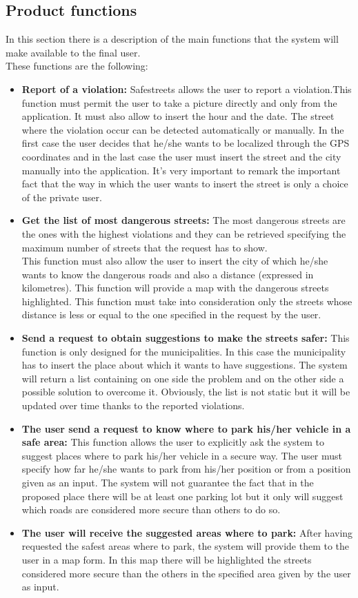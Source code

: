 \documentclass[titlepage]{article}
\begin{document}
\subsection{Product functions}
In this section there is a description of the main functions that the system will make available to the final user.\\
These functions are the following:
\begin{itemize}
	\item \textbf{Report of a violation:} Safestreets allows the user to report a violation.This function must permit the user to take a picture directly and only from the application. It must also allow to insert the hour and the date. The street where the violation occur can be detected automatically or manually. In the first case the user decides that he/she wants to be localized through the GPS coordinates and in the last case the user must insert the street and the city manually into the application. It's very important to remark the important fact that the way in which the user wants to insert the street is only a choice of the private user.
	\item \textbf{Get the list of most dangerous streets: }
	The most dangerous streets are the ones with the highest violations and they can be retrieved specifying the maximum number of streets that the request has to show. \\
This function must also allow the user to insert the city of which he/she wants to know the dangerous roads and also a distance (expressed in kilometres). This function will provide a map with the dangerous streets highlighted. This function must take into consideration only the streets whose distance is less or equal to the one specified in the request by the user. 
	\item \textbf{Send a request to obtain suggestions to make the streets safer:}
	This function is only designed for the municipalities. In this case the municipality has to insert the place about which it wants to have suggestions. The system will return a list containing on one side the problem and on the other side a possible solution to overcome it. Obviously, the list is not static but it will be updated over time thanks to the reported violations.
	\item \textbf{The user send a request to know where to park his/her vehicle in a safe area:}
	This function allows the user to explicitly ask the system to suggest places where to park his/her vehicle in a secure way. 
The user must specify how far he/she wants to park from his/her position or from a position given as an input. The system will not guarantee the fact that in the proposed place there will be at least one parking lot but it only will suggest which roads are considered more secure than others to do so.
	\item \textbf{The user will receive the suggested areas where to park:}
	After having requested the safest areas where to park, the system will provide them to the user in a map form. In this map there will be highlighted the streets considered more secure than the others in the specified area given by the user as input.

\end{itemize}
\end{document}
